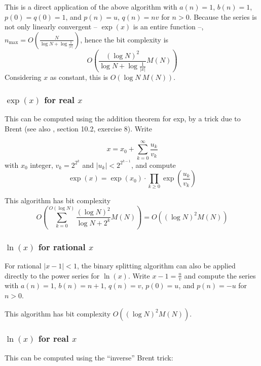This is a direct application of the above algorithm with  \( a(n)=1 \),
\( b(n)=1 \), \( p(0)=q(0)=1 \), and \( p(n)=u \), \( q(n)=nv \) for \( n>0 \).
Because the series is not only linearly convergent -- \( \exp (x) \) is an
entire function --,  \( n_{\max }=O(\frac{N}{\log N + \log \frac{1}{|x|}}) \),
hence the bit complexity is
\[ O\left(\frac{(\log N)^2}{\log N + \log \frac{1}{|x|}} M(N)\right) \]
Considering \(x\) as constant, this is  \( O(\log N\: M(N)) \).


\subsubsection{\( \exp (x) \) for real \( x \)}

This can be computed using the addition theorem for exp, by a trick due to
Brent \cite{76a} (see also \cite{87}, section 10.2, exercise 8). Write

\[
x=x_{0}+\sum _{k=0}^{\infty }\frac{u_{k}}{v_{k}}\]
with  \( x_{0} \) integer,  \( v_{k}=2^{2^{k}} \) and 
\( |u_{k}|<2^{2^{k-1}} \), and compute 
\[
\exp (x)=
\exp (x_{0})\cdot \prod _{k\geq 0}\exp \left( \frac{u_{k}}{v_{k}}\right) \]

This algorithm has bit complexity
\[ O\left(\sum\limits_{k=0}^{O(\log N)} \frac{(\log N)^2}{\log N + 2^k} M(N)\right)
  = O((\log N)^{2}M(N)) \]


\subsubsection{ \( \ln (x) \) for rational  \( x \)}

For rational  \( |x-1|<1 \), the binary splitting algorithm can also be applied
directly to the power series for  \( \ln (x) \). Write  \( x-1=\frac{u}{v} \)
and compute the series with  \( a(n)=1 \),  \( b(n)=n+1 \),  \( q(n)=v \),
\( p(0)=u \), and  \( p(n)=-u \) for  \( n>0 \).

This algorithm has bit complexity  \( O((\log N)^{2}M(N)) \).


\subsubsection{\( \ln (x) \) for real \( x \)}

This can be computed using the ``inverse'' Brent trick:

